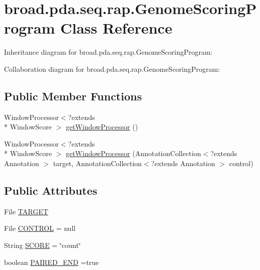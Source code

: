 \hypertarget{classbroad_1_1pda_1_1seq_1_1rap_1_1_genome_scoring_program}{\section{broad.\+pda.\+seq.\+rap.\+Genome\+Scoring\+Program Class Reference}
\label{classbroad_1_1pda_1_1seq_1_1rap_1_1_genome_scoring_program}
}


Inheritance diagram for broad.\+pda.\+seq.\+rap.\+Genome\+Scoring\+Program\+:


Collaboration diagram for broad.\+pda.\+seq.\+rap.\+Genome\+Scoring\+Program\+:
\subsection*{Public Member Functions}
\begin{DoxyCompactItemize}
\item 
Window\+Processor$<$?extends \\*
Window\+Score $>$ \hyperlink{classbroad_1_1pda_1_1seq_1_1rap_1_1_genome_scoring_program_a01cb6e467b39da1cc595e9dadfd7e3fc}{get\+Window\+Processor} ()
\item 
Window\+Processor$<$?extends \\*
Window\+Score $>$ \hyperlink{classbroad_1_1pda_1_1seq_1_1rap_1_1_genome_scoring_program_aeee35502ac7d566b7a32f2564fbf1a9b}{get\+Window\+Processor} (Annotation\+Collection$<$?extends Annotation $>$ target, Annotation\+Collection$<$?extends Annotation $>$ control)
\end{DoxyCompactItemize}
\subsection*{Public Attributes}
\begin{DoxyCompactItemize}
\item 
File \hyperlink{classbroad_1_1pda_1_1seq_1_1rap_1_1_genome_scoring_program_aac4fb950639684f61c7af1cc2e01330c}{T\+A\+R\+G\+E\+T}
\item 
File \hyperlink{classbroad_1_1pda_1_1seq_1_1rap_1_1_genome_scoring_program_acfa8d6ffb03052c84e8766d0cd310470}{C\+O\+N\+T\+R\+O\+L} = null
\item 
String \hyperlink{classbroad_1_1pda_1_1seq_1_1rap_1_1_genome_scoring_program_aa495683afdf659268bd442d9559a09ff}{S\+C\+O\+R\+E} = \char`\"{}count\char`\"{}
\item 
boolean \hyperlink{classbroad_1_1pda_1_1seq_1_1rap_1_1_genome_scoring_program_a9cf7ff6c60a9e7ce0faac2b9932d0b6b}{P\+A\+I\+R\+E\+D\+\_\+\+E\+N\+D} =true
\end{DoxyCompactItemize}
